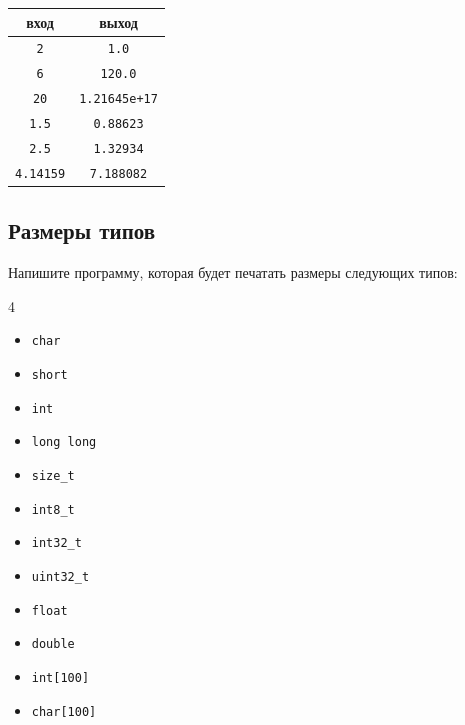 \documentclass[10pt]{article}
\begin{document}
\begin{center}
\begin{tabular}{ c c }
 вход & выход \\ \hline
 \texttt{2} & \texttt{1.0}  \\ 
 \texttt{6} & \texttt{120.0}  \\
 \texttt{20} & \texttt{1.21645e+17}  \\
 \texttt{1.5} &        \texttt{0.88623} \\
 \texttt{2.5} &        \texttt{1.32934}\\
 \texttt{4.14159} & \texttt{7.188082}\\
\end{tabular}
\end{center}




\subsection{Размеры типов}
Напишите программу, которая будет печатать размеры следующих типов:
\begin{multicols}{4}
\begin{itemize}
\item \texttt{char}
\item \texttt{short}
\item \texttt{int}
\item \texttt{long long}
\item \texttt{size\_t}
\item \texttt{int8\_t}
\item \texttt{int32\_t}
\item \texttt{uint32\_t}
\item \texttt{float}
\item \texttt{double}
\item \texttt{int[100]}
\item \texttt{char[100]}
\end{itemize}
\end{multicols}
\end{document}
